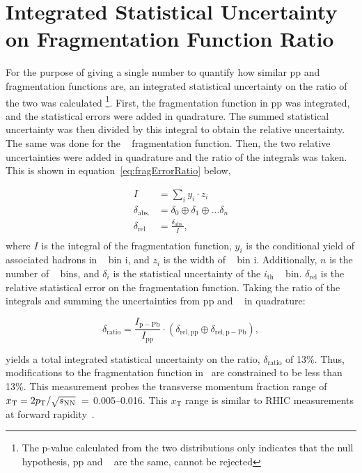 \section{Integrated Statistical Uncertainty on Fragmentation Function Ratio}
For the purpose of giving a single number to quantify how similar pp and \pPb~ fragmentation functions are, an integrated statistical uncertainty on the ratio of the two was calculated \footnote{The p-value calculated from the two distributions only indicates that the null hypothesis, pp and \pPb~ are the same, cannot be rejected}. First, the fragmentation function in pp was integrated, and the statistical errors were added in quadrature. The summed statistical uncertainty was then divided by this integral to obtain the relative uncertainty. The same was done for the \pPb~ fragmentation function. Then, the two relative uncertainties were added in quadrature and the ratio of the integrals was taken. This is shown in equation~\ref{eq:fragErrorRatio} below,

\begin{equation}\label{eq:fragErrorRatio}
  \begin{split}
    I &= \sum_i y_i\cdot z_i \\
    \delta_\mathrm{abs.} &= \delta_0 \oplus \delta_1 \oplus ...\delta_n\\
    \delta_\mathrm{rel} &= \frac{\delta_\mathrm{abs.}}{I},\\
  \end{split}
\end{equation}
where $I$ is the integral of the fragmentation function, $y_i$ is the conditional yield of associated hadrons in \zt~ bin i, and $z_i$ is the width of \zt~ bin i. Additionally, $n$ is the number of \zt~ bins, and $\delta_i$ is the statistical uncertainty of the $i_\mathrm{th}$ \zt~ bin. $\delta_\mathrm{rel}$ is the relative statistical error on the fragmentation function. Taking the ratio of the integrals and summing the uncertainties from pp and \pPb~ in quadrature:

\begin{equation}
  \delta_\mathrm{ratio} = \frac{I_\mathrm{p-Pb}}{I_\mathrm{pp}}\cdot (\delta_\mathrm{rel,pp} \oplus \delta_\mathrm{rel,p-Pb}),
\end{equation}

yields a total integrated statistical uncertainty on the ratio, $\delta_\mathrm{ratio}$ of 13\%. Thus, modifications to the fragmentation function in \pPb~are constrained to be less than 13\%. This measurement probes the transverse momentum fraction range of {$x_{\mathrm{T}} = 2\pt/\sqrt{s_{\mathrm{NN}}}\ = $ 0.005--0.016}. This $x_{\mathrm{T}}$ range is similar to RHIC measurements at forward rapidity~\cite{Adare:2011sc}.

